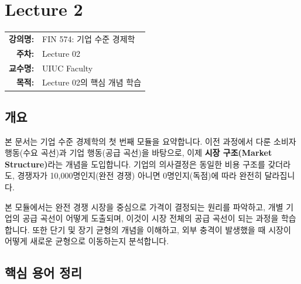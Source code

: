 \documentclass[11pt,a4paper]{book}
\makeatletter
\theoremstyle{definition}
\newcommand{\metainfo}[4]{
\begin{tcolorbox}[
    colback=lightpurple,
    colframe=darkpurple,
    boxrule=1pt,
    arc=2mm,
    left=10pt,
    right=10pt,
    top=8pt,
    bottom=8pt
]
\begin{tabular}{@{}rl@{}}
\textbf{강의명:} & #1 \\[0.3em]
\textbf{주차:} & #2 \\[0.3em]
\textbf{교수명:} & #3 \\[0.3em]
\textbf{목적:} & \begin{minipage}[t]{0.75\textwidth}#4\end{minipage}
\end{tabular}
\end{tcolorbox}
}
\makeatother
\begin{document}
\chapter{Lecture 2}
\label{ch:lecture2}

\metainfo{FIN 574: 기업 수준 경제학}{Lecture 02}{UIUC Faculty}{Lecture 02의 핵심 개념 학습}


\section{개요}

본 문서는 기업 수준 경제학의 첫 번째 모듈을 요약합니다.
이전 과정에서 다룬 소비자 행동(수요 곡선)과 기업 행동(공급 곡선)을 바탕으로,
이제 \textbf{시장 구조(Market Structure)}라는 개념을 도입합니다.
기업의 의사결정은 동일한 비용 구조를 갖더라도, 경쟁자가 10,000명인지(완전 경쟁) 아니면 0명인지(독점)에 따라 완전히 달라집니다.

본 모듈에서는 완전 경쟁 시장을 중심으로 가격이 결정되는 원리를 파악하고,
개별 기업의 공급 곡선이 어떻게 도출되며, 이것이 시장 전체의 공급 곡선이 되는 과정을 학습합니다.
또한 단기 및 장기 균형의 개념을 이해하고, 외부 충격이 발생했을 때 시장이 어떻게 새로운 균형으로 이동하는지 분석합니다.

\section{핵심 용어 정리}
\end{document}
